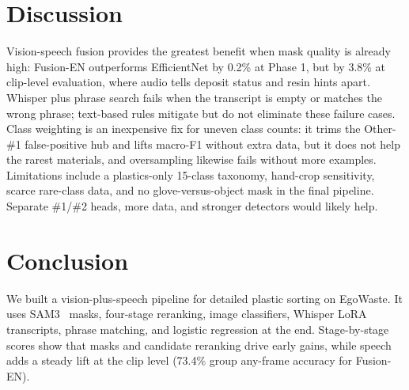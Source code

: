 \documentclass[conference]{IEEEtran}
\begin{document}
\section{Discussion}
\label{sec:discussion}
Vision-speech fusion provides the greatest benefit when mask quality is already high: Fusion-EN outperforms EfficientNet by 0.2\% at Phase 1, but by 3.8\% at clip-level evaluation, where audio tells deposit status and resin hints apart.
Whisper plus phrase search fails when the transcript is empty or matches the wrong phrase; text-based rules mitigate but do not eliminate these failure cases.
Class weighting is an inexpensive fix for uneven class counts: it trims the Other-\#1 false-positive hub and lifts macro-F1 without extra data, but it does not help the rarest materials, and oversampling likewise fails without more examples.
Limitations include a plastics-only 15-class taxonomy, hand-crop sensitivity, scarce rare-class data, and no glove-versus-object mask in the final pipeline. Separate \#1/\#2 heads, more data, and stronger detectors would likely help.

\section{Conclusion}
\label{sec:conclusion}
We built a vision-plus-speech pipeline for detailed plastic sorting on EgoWaste. It uses SAM3~\cite{carion2025sam3} masks, four-stage reranking, image classifiers, Whisper LoRA transcripts, phrase matching, and logistic regression at the end.
Stage-by-stage scores show that masks and candidate reranking drive early gains, while speech adds a steady lift at the clip level (73.4\% group any-frame accuracy for Fusion-EN).

\balance


\end{document}
